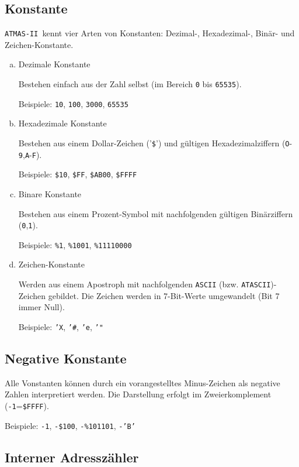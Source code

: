 \documentclass[10pt,a4paper,twoside,final,openright,titlepage]{memoir}
\def\atmas{\texttt{AT\-MAS-II }}
\begin{document}
\subsection{Konstante}

\atmas kennt vier Arten von Konstanten: Dezimal-,
Hexadezimal-, Binär- und Zeichen-Konstante.

\begin{enumerate}[a)]

\item Dezimale Konstante

Bestehen einfach aus der Zahl selbst (im Bereich \texttt{0} bis
\texttt{65535}).

	Beispiele: \texttt{10}, \texttt{100}, \texttt{3000}, \texttt{65535}

\item Hexadezimale Konstante

Bestehen aus einem Dollar-Zeichen ('\texttt{\$}') und gültigen
Hexadezimalziffern (\texttt{O}-\texttt{9},\texttt{A}-\texttt{F}).

	Beispiele: \texttt{\$10}, \texttt{\$FF}, \texttt{\$AB00}, \texttt{\$FFFF}

\item Binare Konstante

Bestehen aus einem Prozent-Symbol mit nachfolgenden
gültigen Bi\-när\-zif\-fern (\texttt{0},\texttt{1}).

	Beispiele: \texttt{\%1}, \texttt{\%1001}, \texttt{\%11110000}

\item Zeichen-Konstante

Werden aus einem Apostroph mit nachfolgenden \texttt{ASCII}
(bzw. \texttt{ATASCII})-Zeichen gebildet. Die Zeichen werden in
7-Bit-Werte umgewandelt (Bit 7 immer Null).

	Beispiele: \texttt{'X}, \texttt{'\#}, \texttt{'e}, \texttt{'"}
\end{enumerate}

\subsection{Negative Konstante}

Alle Vonstanten können durch ein vorangestelltes
Minus-Zeichen als negative Zahlen interpretiert
werden. Die Darstellung erfolgt im Zweierkomplement
(\texttt{-1}=\texttt{\$FFFF}).

	Beispiele: \texttt{-1}, \texttt{-\$100}, \texttt{-\%101101}, \texttt{-'B'}

\subsection{Interner Adresszähler}
\end{document}
